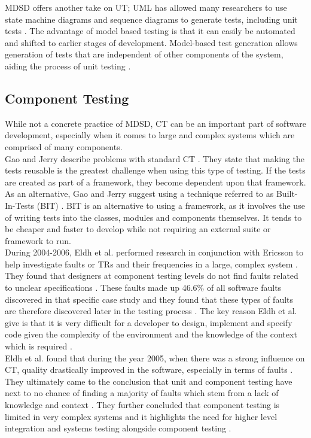 \documentclass[fina_report_innit.tex]{subfiles}
\begin{document}
MDSD offers another take on UT; UML has allowed many researchers to use state machine diagrams and sequence diagrams to generate tests, including unit tests \cite{mussa2009survey}. The advantage of model based testing is that it can easily be automated and shifted to earlier stages of development. Model-based test generation allows generation of tests that are independent of other components of the system, aiding the process of unit testing \cite{javed2007automated}.

\subsection{Component Testing}
While not a concrete practice of MDSD, CT can be an important part of software development, especially when it comes to large and complex systems which are comprised of many components.
\\

Gao and Jerry describe problems with standard CT \cite{gao2000component}. They state that making the tests reusable is the greatest challenge when using this type of testing. If the tests are created as part of a framework, they become dependent upon that framework. As an alternative, Gao and Jerry suggest using a technique referred to as Built-In-Tests (BIT) \cite{gao2000component}. BIT is an alternative to using a framework, as it involves the use of writing tests into the classes, modules and components themselves. It tends to be cheaper and faster to develop while not requiring an external suite or framework to run.
\\

During 2004-2006, Eldh et al. performed research in conjunction with Ericsson to help investigate faults or TRs and their frequencies in a large, complex system \cite{eldh2007component}. They found that designers at component testing levels do not find faults related to unclear specifications \cite{eldh2007component}. These faults made up 46.6\% of all software faults discovered in that specific case study and they found that these types of faults are therefore discovered later in the testing process \cite{eldh2007component}. The key reason Eldh et al. give is that it is very difficult for a developer to design, implement and specify code given the complexity of the environment and the knowledge of the context which is required \cite{eldh2007component}. 
\\

Eldh et al. found that during the year 2005, when there was a strong influence on CT, quality drastically improved in the software, especially in terms of faults \cite{eldh2007component}. They ultimately came to the conclusion that unit and component testing have next to no chance of finding a majority of faults which stem from a lack of knowledge and context \cite{eldh2007component}. They further concluded that component testing is limited in very complex systems and it highlights the need for higher level integration and systems testing alongside component testing \cite{eldh2007component}.
\end{document}
